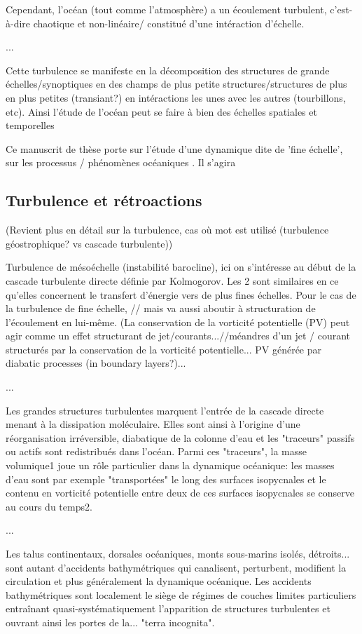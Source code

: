 Cependant, l'océan (tout comme l'atmosphère) a un écoulement turbulent, c'est-à-dire chaotique et non-linéaire/ constitué d'une intéraction d'échelle.

...

Cette turbulence se manifeste en la décomposition des structures de grande échelles/synoptiques en des champs de plus petite structures/structures de plus en plus petites (transiant?) en intéractions les unes avec les autres (tourbillons, etc). Ainsi l'étude de l'océan peut se faire à bien des échelles spatiales et temporelles

Ce manuscrit de thèse porte sur l'étude d'une dynamique dite de 'fine échelle', sur les processus / phénomènes océaniques . Il s'agira 

\subsection{Turbulence et rétroactions}
(Revient plus en détail sur la turbulence, cas où mot est utilisé (turbulence géostrophique? vs cascade turbulente))

Turbulence de mésoéchelle (instabilité barocline), ici on s'intéresse au début de la cascade turbulente directe définie par Kolmogorov. Les 2 sont similaires en ce qu'elles concernent le transfert d'énergie vers de plus fines échelles. Pour le cas de la turbulence de fine échelle, // mais va aussi aboutir à structuration de l'écoulement en lui-même. (La conservation de la vorticité potentielle (PV) peut agir comme un effet structurant de jet/courants...//méandres d'un jet / courant structurés par la conservation de la vorticité potentielle... PV générée par diabatic processes (in boundary layers?)...

...

Les grandes structures turbulentes marquent l'entrée de la cascade directe menant à la dissipation moléculaire. Elles sont ainsi à l'origine d'une réorganisation irréversible, diabatique de la colonne d'eau et les "traceurs" passifs ou actifs sont redistribués dans l'océan. Parmi ces "traceurs", la masse volumique1 joue un rôle particulier dans la dynamique océanique: les masses d'eau sont par exemple "transportées" le long des surfaces isopycnales et le contenu en vorticité potentielle entre deux de ces surfaces isopycnales se conserve au cours du temps2.

...

Les talus continentaux, dorsales océaniques, monts sous-marins isolés, détroits... sont autant d'accidents bathymétriques qui canalisent, perturbent, modifient la circulation et plus généralement la dynamique océanique. Les accidents bathymétriques sont localement le siège de régimes de couches limites particuliers entraînant quasi-systématiquement l'apparition de structures turbulentes et ouvrant ainsi les portes de la... "terra incognita".

